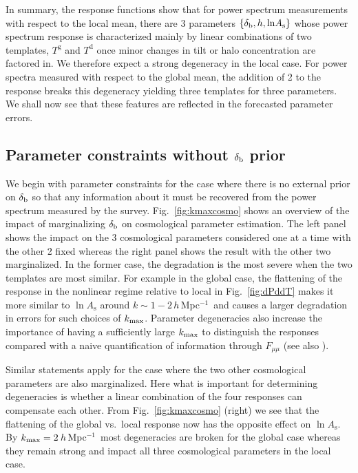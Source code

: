 \documentclass[prd,twocolumn,amsmath,amssymb,floatfix,superscriptaddress]{revtex4-1}
\newcommand{\lnAs}{{\ln\!A_\textrm{s}}}
\newcommand{\br}{{\rm b}}
\newcommand{\hMpci}{$h\,$Mpc$^{-1}$}
\begin{document}
{{In summary, the response functions show that for power spectrum measurements
with respect to the local mean, there are 3 parameters $\{ \delta_\br, h, \lnAs \}$ whose power 
spectrum response is  characterized mainly by linear combinations of two templates, $T^\textrm{g}$
and $T^\textrm{d}$ once minor changes in tilt or {halo} concentration are
factored in. We therefore expect a strong degeneracy in the local case.  For power
spectra measured with respect to the global mean, the addition of 2 to the response breaks this degeneracy yielding three templates for
three parameters.  
We shall now see that these features are reflected in the forecasted
parameter errors.








\subsection{Parameter constraints without $\delta_\br$ prior}
\label{sub:degen}


We begin with parameter constraints for the case where there is no
external prior on $\delta_\br$ so that any information about it  must be recovered
from the power spectrum measured by the survey.
Fig.~\ref{fig:kmaxcosmo} shows an overview of the impact of marginalizing $\delta_\br$ on
cosmological parameter estimation.
The left panel shows the impact on the 3 cosmological parameters considered one at
a time with the other 2 fixed whereas the right panel shows the result with the other two
marginalized.    In the former case, the degradation 
{is} 
the most severe when
the two templates are most similar.   For example in the global case,  the flattening of
the response in the nonlinear regime relative to local in Fig.~\ref{fig:dPddT} makes
it more similar to $\lnAs$ around $k\sim 1-2\,$\hMpci\ and causes a larger
degradation in errors for such choices of $k_{\rm max}$.  
Parameter degeneracies also increase the importance of having a sufficiently
large $k_{\rm max}$ to distinguish the responses compared with a naive
quantification of information through $F_{\mu\mu}$
\cite{RimesHamilton:05,RimesHamilton:06} (see also \cite{TakadaJain:09,Satoetal:09}).  


Similar statements apply for the case where the two other cosmological parameters
are also marginalized.   Here what is important for determining degeneracies is whether
a  linear combination of the four responses can compensate each other.   
From Fig.~\ref{fig:kmaxcosmo} (right) we see that the flattening of the global vs.~local response
now has the opposite effect on $\lnAs$.  By $k_{\rm max}=2\,$\hMpci\ most 
degeneracies are broken for the global case whereas they remain strong and impact
all three cosmological parameters  in the local case.

}}
\end{document}
